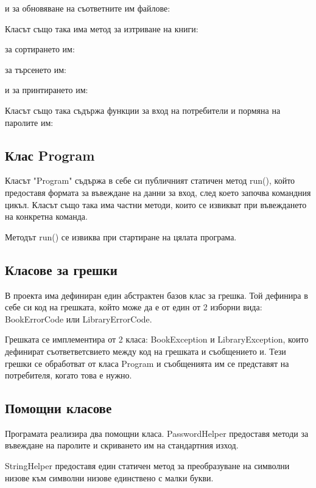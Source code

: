 и за обновяване на съответните им файлове:



Класът също така има метод за изтриване на книги:


за сортирането им:


за търсенето им:


и за принтирането им:


Класът също така съдържа функции за вход на потребители и пормяна на паролите им:


\subsection{Клас Program}

Класът "Program" съдържа в себе си публичният статичен метод run(), който предоставя формата за въвеждане на данни за вход, след което започва командния цикъл. Класът също така има частни методи, които се извикват при въвеждането на конкретна команда.



Методът run() се извиква при стартиране на цялата програма.




\subsection{Класове за грешки}

В проекта има дефиниран един абстрактен базов клас за грешка. Той дефинира в себе си код на грешката, който може да е от един от 2 изборни вида: BookErrorCode или LibraryErrorCode.



Грешката се имплементира от 2 класа: BookException и LibraryException, които дефинират съответветсвието между код на грешката и съобщението и. Тези грешки се обработват от класа Program и съобщенията им се представят на потребителя, когато това е нужно.




\subsection{Помощни класове}
Програмата реализира два помощни класа. PasswordHelper предоставя методи за въвеждане на паролите и скриването им на стандартния изход.



StringHelper предоставя един статичен метод за преобразуване на символни низове към символни низове единствено с малки букви.

